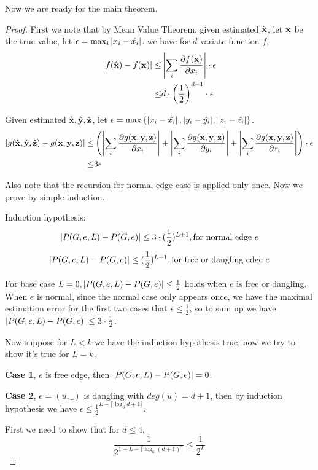 	Now we are ready for the main theorem.

	\begin{proof}
		First we note that by Mean Value Theorem,
		given estimated $\hat{\bf x}$, let ${\bf x}$ be the true value, let $\epsilon = \max_i{\left\vert x_i - \hat{x_i}\right\vert}$.
		we have for $d$-variate function $f$,
		\begin{align*}
		\left\vert f(\hat{\bf x}) - f({\bf x})\right\vert \leq& \left\vert\sum_i \frac{\partial f({\bf x})}{\partial x_i}\right\vert \cdot \epsilon \\
		\leq & d\cdot \left( \frac{1}{2} \right)^{d-1} \cdot \epsilon
		\end{align*}

		Given estimated $\hat{\bf x},\hat{\bf y},\hat{\bf z}$, let $\epsilon = \max \left\{\left\vert x_i - \hat{x_i}\right\vert, \left\vert y_i - \hat{y_i} \right\vert , \left\vert z_i - \hat{z_i}\right\vert\right\}$.
		\begin{align*}
		\left\vert g(\hat{\bf x}, \hat{\bf y}, \hat{\bf z}) - g({\bf x,y,z})\right\vert \leq & \left(  \left\vert\sum_i \frac{\partial g({\bf x,y,z})}{\partial x_i}\right\vert +\left\vert \sum_i \frac{\partial g({\bf x,y,z})}{\partial y_i}\right\vert + \left\vert \sum_i \frac{\partial g({\bf x,y,z})}{\partial z_i}\right\vert \right) \cdot \epsilon \\
		\leq & 3\epsilon
		\end{align*}


		Also note that the recursion for normal edge case is applied only once.
		Now we prove by simple induction.

		Induction hypothesis:
		\[\left\vert P(G,e,L) - P(G,e)\right\vert \leq 3\cdot(\frac{1}{2})^{L+1}, \textrm{for normal edge $e$}\]
		\[\left\vert P(G,e,L) - P(G,e)\right\vert \leq (\frac{1}{2})^{L+1}, \textrm{for free or dangling edge $e$}\]
		
		For base case $L=0, \left\vert P(G,e,L) - P(G,e)\right\vert \leq \frac{1}{2}$ holds when $e$ is free or dangling. When $e$ is normal, since the normal case only appears once, we have the maximal estimation error for the first two cases that $\epsilon \leq \frac{1}{2}$, so to sum up we have $\left\vert P(G,e,L) - P(G,e)\right\vert \leq 3\cdot\frac{1}{2}$.

		Now suppose for $L<k$ we have the induction hypothesis true, now we try to show it's true for $L=k$.

		{\bf Case 1}, $e$ is free edge, then $\left\vert P(G,e,L) - P(G,e)\right\vert = 0$.

		{\bf Case 2}, $e=(u,\_)$ is dangling with $deg(u)=d+1$, then by induction hypothesis we have $\epsilon \leq \frac{1}{2}^{L-\lceil \log_6{d+1}\rceil}$.

		First we need to show that for $d \leq 4$,
		\[\frac{1}{2^{1+L-\lceil \log_6{(d+1)}\rceil}} \leq \frac{1}{2^L}\]


\end{proof}
